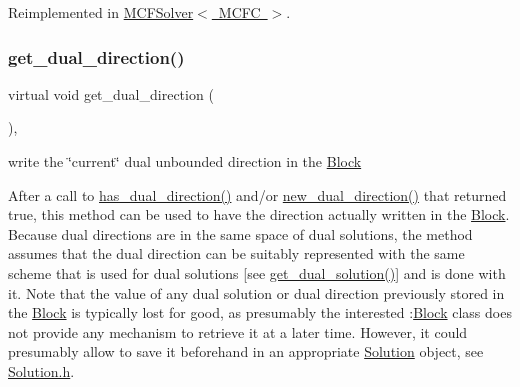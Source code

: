 Reimplemented in \mbox{\hyperlink{class_s_m_spp__di__unipi__it_1_1_m_c_f_solver_a75dd1491b74c4b9476755e061dce3e04}{M\+C\+F\+Solver$<$ M\+C\+F\+C $>$}}.

\mbox{\label{class_s_m_spp__di__unipi__it_1_1_c_d_a_solver_a145672680f07ca7eef090900b8d6ddcf}} 
\subsubsection{\texorpdfstring{get\+\_\+dual\+\_\+direction()}{get\_dual\_direction()}}
{\footnotesize\ttfamily virtual void get\+\_\+dual\+\_\+direction (\begin{DoxyParamCaption}\item[{void}]{ }\end{DoxyParamCaption})\hspace{0.3cm}{\ttfamily [inline]}, {\ttfamily [virtual]}}



write the \char`\"{}current\char`\"{} dual unbounded direction in the \mbox{\hyperlink{class_s_m_spp__di__unipi__it_1_1_block}{Block}} 

After a call to \mbox{\hyperlink{class_s_m_spp__di__unipi__it_1_1_c_d_a_solver_a4247feaa72c255f28a2a71b5e634b60a}{has\+\_\+dual\+\_\+direction()}} and/or \mbox{\hyperlink{class_s_m_spp__di__unipi__it_1_1_c_d_a_solver_ad83925e362d49bbe570a881791e45ea0}{new\+\_\+dual\+\_\+direction()}} that returned true, this method can be used to have the direction actually written in the \mbox{\hyperlink{class_s_m_spp__di__unipi__it_1_1_block}{Block}}. Because dual directions are in the same space of dual solutions, the method assumes that the dual direction can be suitably represented with the same scheme that is used for dual solutions \mbox{[}see \mbox{\hyperlink{class_s_m_spp__di__unipi__it_1_1_c_d_a_solver_a347d37171494bf83416a48b279b94d5a}{get\+\_\+dual\+\_\+solution()}}\mbox{]} and is done with it. Note that the value of any dual solution or dual direction previously stored in the \mbox{\hyperlink{class_s_m_spp__di__unipi__it_1_1_block}{Block}} is typically lost for good, as presumably the interested \+:\mbox{\hyperlink{class_s_m_spp__di__unipi__it_1_1_block}{Block}} class does not provide any mechanism to retrieve it at a later time. However, it could presumably allow to save it beforehand in an appropriate \mbox{\hyperlink{class_s_m_spp__di__unipi__it_1_1_solution}{Solution}} object, see \mbox{\hyperlink{_solution_8h}{Solution.\+h}}.

